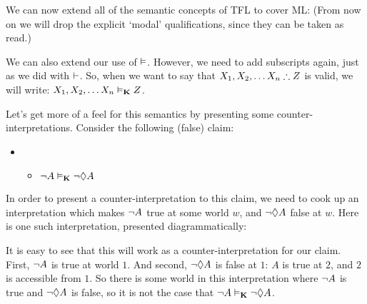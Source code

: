 We can now extend all of the semantic concepts of TFL to cover ML:
(From now on we will drop the explicit `modal' qualifications, since they can be taken as read.)

We can also extend our use of $\vDash$. However, we need to add subscripts again, just as we did with $\vdash$. So, when we want to say that $\metaX_1,\metaX_2, \dots \metaX_n\therefore\metaZ$ is valid, we will write: $X_1,X_2, \dots X_n\vDash_{\mathbf{K}}Z$. 

Let's get more of a feel for this semantics by presenting some counter-interpretations. Consider the following (false) claim:
\begin{itemize}
	\item[]
	      \begin{itemize}
		      \item[]$\neg A\vDash_{\mathbf{K}} \neg \Diamond A$
	      \end{itemize}
\end{itemize}
In order to present a counter-interpretation to this claim, we need to cook up an interpretation which makes $\neg A$ true at some world $w$, and $\neg\Diamond A$ false at $w$. Here is one such interpretation, presented diagrammatically:
\begin{center}
\end{center}
It is easy to see that this will work as a counter-interpretation for our claim. First, $\neg A$ is true at world $1$. And second, $\neg\Diamond A$ is false at $1$: $A$ is true at $2$, and $2$ is accessible from $1$. So there is some world in this interpretation where $\neg A$ is true and $\neg\Diamond A$ is false, so it is not the case that $\neg A\vDash_{\mathbf{K}}\neg\Diamond A$.


